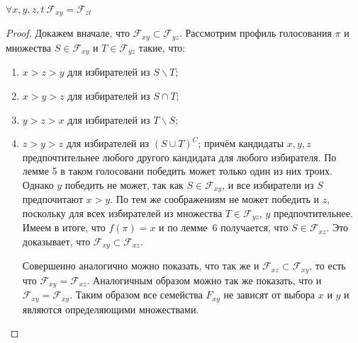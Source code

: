\begin{lemma}
$\forall x, y, z, t\ \mathcal{F}_{xy} = \mathcal{F}_{zt}$
\end{lemma}
\begin{proof}
Докажем вначале, что $\mathcal{F}_{xy}\subset\mathcal{F}_{yz}$. Рассмотрим профиль голосования $\pi$ и множества $S\in \mathcal{F}_{xy}$ и $T\in\mathcal{F}_{yz}$ такие, что:
\begin{enumerate}
\item $x > z > y$ для избирателей из $S\backslash T$;
\item $x>y>z$ для избирателей из $S\cap T$;
\item $y>z>x$ для избирателей из $T\backslash S$;
\item $z>y>z$ для избирателей из $(S\cup T)^C$;
причём кандидаты $x, y, z$ предпочтительнее любого другого кандидата для любого избирателя. По лемме 5 в таком голосовани победить может только один из них троих. Однако $y$ победить не может, так как $S\in\mathcal{F}_{xy}$, и все избиратели из $S$ предпочитают $x>y$. По тем же соображениям не может победить и $z$, поскольку для всех избирателей из множества $T\in\mathcal{F}_{yz}$, $y$ предпочтительнее. Имеем в итоге, что $f(\pi)=x$ и по лемме~6 получается, что $S\in\mathcal{F}_{xz}$. Это доказывает, что $\mathcal{F}_{xy}\subset\mathcal{F}_{xz}$.

Совершенно аналогично можно показать, что так же и $\mathcal{F}_{xz}\subset\mathcal{F}_{xy}$, то есть что $\mathcal{F}_{xy}=\mathcal{F}_{xz}$. Аналогичным образом можно так же показать, что и $\mathcal{F}_{xy}=\mathcal{F}_{xy}$. Таким образом все семейства $F_{xy}$ не зависят от выбора $x$ и $y$ и являются определяющими множествами.
\end{enumerate}
\end{proof}

